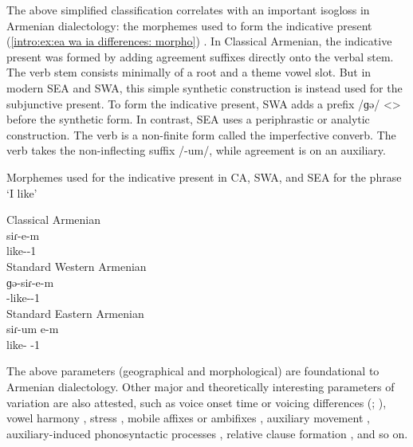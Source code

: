 \documentclass[output=paper]{langscibook}
\begin{document}
 
The above simplified classification correlates with an important isogloss in Armenian dialectology: the morphemes used to form the indicative present (\ref{intro:ex:ea wa ia differences: morpho}) \citep{Vaux-1995-ArmenianVerbDiachrony}. In Classical Armenian, the indicative present was formed by adding agreement suffixes directly onto  the verbal stem. The verb stem consists minimally of a root and a theme vowel slot. But in modern SEA and SWA, this simple synthetic construction is instead used for the subjunctive present. To form the indicative present, SWA adds a prefix /ɡə/ <> before the synthetic form. In contrast, SEA uses a periphrastic or analytic construction. The verb is a non-finite form called the imperfective converb. The verb takes the non-inflecting suffix /-um/, while agreement is on an auxiliary. 

\newpage
\begin{exe}
	\ex Morphemes used for the indicative present in CA, SWA, and SEA  for the phrase `I like' \label{intro:ex:ea wa ia differences: morpho}
	\begin{xlist}
		\ex Classical Armenian \\
		\gll   siɾ-e-m \\
		like-{\thgloss}-1{\sg} \\
		\trans {}
		\ex Standard Western Armenian \\
		\gll ɡə-siɾ-e-m \\
		{\ind}-like-{\thgloss}-1{\sg}\\
\trans {}
		\ex Standard Eastern Armenian \\
		\gll siɾ-um e-m \\
		like-{\impfcvb} {\aux}-1{\sg}\\
 \trans {}
	\end{xlist}
\end{exe} 



The above parameters (geographical and morphological) are foundational to Armenian dialectology. Other       major and theoretically interesting parameters of variation are also attested, such as voice onset time or voicing differences (\citealt[\S1.1.1]{Vaux-1998-ArmenianPhono}; \citealt{Baronian-2017-TwoProblemsArmenianPhono}), vowel harmony \citep{Vaux-1998-ArmenianPhono}, stress \citep{DeLisi-2018-ArmenianProsodyDiachrony}, mobile affixes or ambifixes \citep{BezrukovDolatian-2020-PLCArmenianMobile,Bezrukov-2022-DissCaucasusMotionArmenian}, auxiliary movement \citep{Comrie-1984-SomeFormalPropertiesFOcusEasternArmenian,KahnemuyipourMegerdoomian-2011-secondcliticvP,KahnemuyipourMegerdoomian-2017-positionalDistriutionFocus}, auxiliary-induced phonosyntactic processes \citep[\S3.3]{DolatianEtAl-prep-IranianGrammar}, relative clause formation \citep{Hodgson-2019-DissRelativeClauseArmenianSyntax}, and so on.
\end{document}
